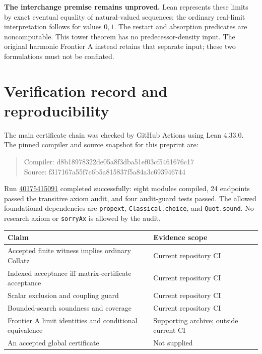 \documentclass[11pt,a4paper]{article}
\theoremstyle{definition}
\newcommand{\name}[1]{{\small\texttt{#1}}}
\begin{document}
\textbf{The interchange premise remains unproved.}
Lean represents these limits by exact eventual equality of natural-valued
sequences; the ordinary real-limit interpretation follows for values $0,1$.
The restart and absorption predicates are noncomputable. This tower theorem
has no predecessor-density input. The original harmonic Frontier A instead
retains that separate input; these two formulations must not be conflated.

\newpage
\section{Verification record and reproducibility}
\begingroup\small
The main certificate chain was checked by GitHub Actions using Lean 4.33.0.
The pinned compiler and source snapshot for this preprint are:
\begin{quote}\small\ttfamily
Compiler: d8b18978322de05a8f3dba51ef03cf5461676c17\\
Source: \phantom{ab}f317167a55f7c6b5a815837f5a84a3c693946744
\end{quote}
Run \href{https://github.com/randogelist/Collatz-Final/actions/runs/40175415091}
{40175415091} completed successfully: eight modules compiled, 24 endpoints
passed the transitive axiom audit, and four audit-guard tests passed.
The allowed foundational dependencies are \name{propext},
\name{Classical.choice}, and \name{Quot.sound}. No research axiom or
\name{sorryAx} is allowed by the audit.

\begin{center}
\begin{tabular}{@{}p{}p{}@{}}
\toprule
Claim & Evidence scope\\
\midrule
Accepted finite witness implies ordinary Collatz & Current repository CI\\
Indexed acceptance iff matrix-certificate acceptance & Current repository CI\\
Scalar exclusion and coupling guard & Current repository CI\\
Bounded-search soundness and coverage & Current repository CI\\
Frontier A limit identities and conditional equivalence & Supporting archive; outside current CI\\
An accepted global certificate & Not supplied\\
\bottomrule
\end{tabular}
\end{center}
\end{document}
